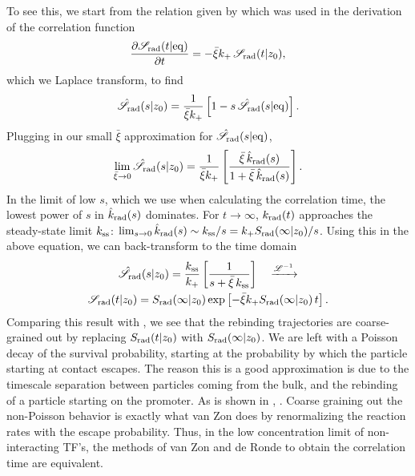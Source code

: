To see this, we start from the relation given by  which was used in the derivation of the correlation function 
\begin{equation}
 \frac{\partial \mathscr{S}_{\rm rad}(t|{\rm eq})}{\partial t} = -\bar{\xi} k_+ \, \mathscr{S}_{\rm rad}(t|z_0),
\end{equation}
which we Laplace transform, to find
\begin{equation}
 \hat{\mathscr{S}}_{\rm rad}(s|z_0) = \frac{1}{\bar{\xi}k_+} \left[ 1 - s\,\hat{\mathscr{S}}_{\rm rad}(s|{\rm eq})\right].
\end{equation}
Plugging in our small $\bar{\xi}$ approximation for $\hat{\mathscr{S}}_{\rm rad}(s|{\rm eq})$, 
\begin{equation}
 \lim_{\bar{\xi}\to 0} \hat{\mathscr{S}}_{\rm rad}(s|z_0) = \frac{1}{\bar{\xi} k_+} \left[ \frac{\bar{\xi}\,\hat{k}_{\rm rad}(s)}{1 + \bar{\xi}\,\hat{k}_{\rm rad}(s)}\right].
\end{equation}
In the limit of low $s$, which we use when calculating the correlation time, the lowest power of $s$ in $\hat{k}_{\rm rad}(s)$ dominates. For $t\to\infty$, $k_{\rm rad}(t)$ approaches the steady-state limit $k_{\rm ss}$: $\lim_{s\to0} \hat{k}_{\rm rad}(s) \sim k_{\rm ss}/s = k_+ S_{\rm rad}(\infty|z_0)/s$. Using this in the above equation, we can back-transform to the time domain
\begin{multline}
 \hat{\mathscr{S}}_{\rm rad}(s|z_0) = \frac{k_{\rm ss}}{k_+} \left[ \frac{1}{s + \bar{\xi}\,k_{\rm ss}} \right] \quad \xrightarrow{\mathscr{L}^{-1}} \\ \mathscr{S}_{\rm rad}(t|z_0) = S_{\rm rad}(\infty|z_0)\,{\rm exp}\left[ -\bar{\xi} k_+ S_{\rm rad}(\infty|z_0)\,t \right].
\end{multline}
Comparing this result with , we see that the rebinding trajectories are coarse-grained out by replacing $S_{\rm rad}(t|z_0)$ with $S_{\rm rad}(\infty|z_0)$. We are left with a Poisson decay of the survival probability, starting at the probability by which the particle starting at contact escapes. The reason this is a good approximation is due to the timescale separation between particles coming from the bulk, and the rebinding of a particle starting on the promoter. As is shown in , . Coarse graining out the non-Poisson behavior is exactly what van Zon does by renormalizing the reaction rates with the escape probability. Thus, in the low concentration limit of non-interacting TF's, the methods of van Zon and de Ronde to obtain the correlation time are equivalent.

